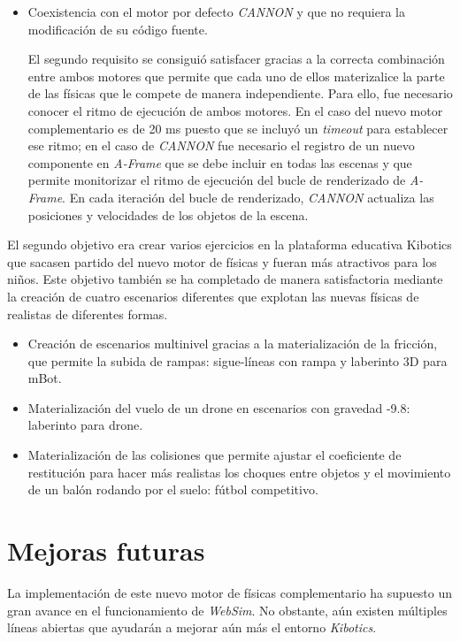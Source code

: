 \begin{itemize}
    \item Coexistencia con el motor por defecto \textit{CANNON} y que no requiera la modificación de su código fuente.
    
    El segundo requisito se consiguió satisfacer gracias a la correcta combinación entre ambos motores que permite que cada uno de ellos materizalice la parte de las físicas que le compete de manera independiente. Para ello, fue necesario conocer el ritmo de ejecución de ambos motores. En el caso del nuevo motor complementario es de 20 ms puesto que se incluyó un \textit{timeout} para establecer ese ritmo; en el caso de \textit{CANNON} fue necesario el registro de un nuevo componente en \textit{A-Frame} que se debe incluir en todas las escenas y que permite monitorizar el ritmo de ejecución del bucle de renderizado de \textit{A-Frame}. En cada iteración del bucle de renderizado, \textit{CANNON} actualiza las posiciones y velocidades de los objetos de la escena. 
\end{itemize}

El segundo objetivo era crear varios ejercicios en la plataforma educativa Kibotics que sacasen partido del nuevo motor de físicas y fueran más atractivos para los niños. Este objetivo también se ha completado de manera satisfactoria mediante la creación de cuatro escenarios diferentes que explotan las nuevas físicas de realistas de diferentes formas.

\begin{itemize}
    \item Creación de escenarios multinivel gracias a la materialización de la fricción, que permite la subida de rampas: sigue-líneas con rampa y laberinto 3D para mBot.
    \item Materialización del vuelo de un drone en escenarios con gravedad -9.8: laberinto para drone.
    \item Materialización de las colisiones que permite ajustar el coeficiente de restitución para hacer más realistas los choques entre objetos y el movimiento de un balón rodando por el suelo: fútbol competitivo.
\end{itemize}


\section{Mejoras futuras}
La implementación de este nuevo motor de físicas complementario ha supuesto un gran avance en el funcionamiento de \textit{WebSim}. No obstante, aún existen múltiples líneas abiertas que ayudarán a mejorar aún más el entorno \textit{Kibotics}.

